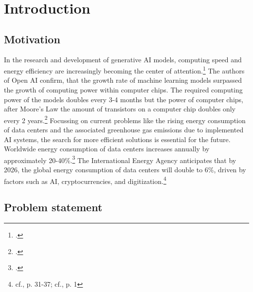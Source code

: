 \chapter{Introduction}


\section{Motivation}

In the research and development of generative AI models, computing speed and energy efficiency
are increasingly becoming the center of attention.\footcite[cf.][1]{luccioniPowerHungryProcessing2023}
The authors of Open AI confirm, that the growth rate of machine learning models 
surpassed the growth of computing power within computer chips.
The required computing power of the models doubles every 3-4 months but the power of computer chips, after Moore’s Law 
the amount of transistors on a computer chip doubles only every 2 years.\footcite[cf.][1]{darioamodeiAICompute}
Focussing on current problems like the rising energy consumption of data centers and the associated
greenhouse gas emissions due to implemented AI systems, the search for more efficient solutions is essential for the future.
Worldwide energy consumption of data centers increases annually by approximately 20-40\%.\footcite[cf.][1]{hintemannDataCenters20212022} 
The International Energy Agency anticipates that by 2026, the global energy consumption of data centers will double to 6\%, driven by factors such as AI, cryptocurrencies, and digitization.\footnote{cf.\cite{anon.Electricity2024Analysis2024}, p. 31-37; cf.\cite{jacksonAIBoomWill2024}, p. 1}

\section{Problem statement}

